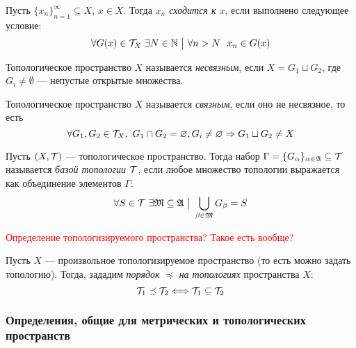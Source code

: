 %
%	

\begin{definition}
	Пусть $\{x_n\}_{n = 1}^\infty \subseteq X$, $x \in X$. Тогда \textit{$x_n$ сходится к $x$}, если выполнено следующее условие:
	\[
		\forall G(x) \in \mathcal{T}_X\ \exists N \in \mathbb{N} \ \big|\  \forall n > N\ \ x_n \in G(x)
	\]
\end{definition}

\begin{definition}
	Топологическое пространство $X$ называется \textit{несвязным}, если $X = G_1 \sqcup G_2$, где $G_i \neq \emptyset$ --- непустые открытые множества.
\end{definition}

\begin{definition}
	Топологическое пространство $X$ называется \textit{связным}, если оно не несвязное, то есть
	\[
		\forall G_1, G_2 \in \mathcal{T}_X,\ G_1 \cap G_2 = \varnothing, G_i \neq \varnothing \Rightarrow G_1 \sqcup G_2 \neq X 
	\]
\end{definition}

\begin{definition}
	Пусть $(X, \mathcal{T})$ --- топологическое пространство. Тогда набор $\Gamma = \{G_\alpha\}_{\alpha \in \mathfrak{A}} \subseteq \mathcal{T}$ называется \textit{базой топологии $\mathcal{T}$}, если любое множество топологии выражается как объединение элементов $\Gamma$:
	\[
		\forall S \in \mathcal{T}\ \exists \mathfrak{M} \subseteq \mathfrak{A} \ \big|\  \bigcup_{\beta \in \mathfrak{M}} G_\beta = S
	\]
\end{definition}

\textcolor{red}{Определение топологизируемого пространства? Такое есть вообще?}

\begin{definition}
	Пусть $X$ --- произвольное топологизируемое пространство (то есть можно задать топологию). Тогда, зададим \textit{порядок $\preceq$ на топологиях} пространства $X$:
	\[
		\mathcal{T}_1 \preceq \mathcal{T}_2 \Longleftrightarrow \mathcal{T}_1 \subseteq \mathcal{T}_2
	\]
\end{definition}

\subsubsection*{Определения, общие для метрических и топологических пространств}

